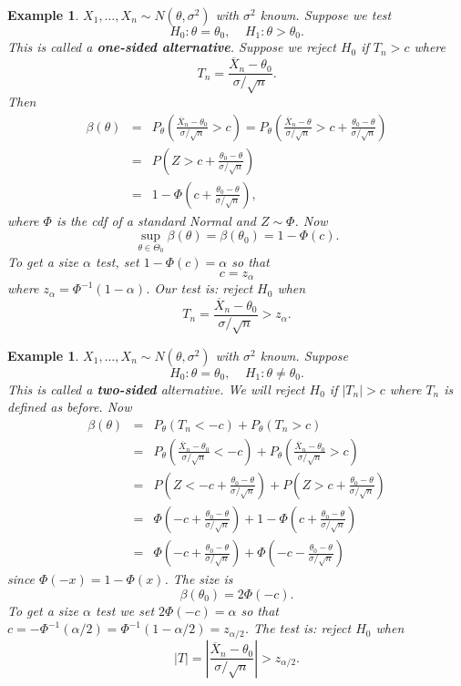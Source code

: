 \documentclass[twoside,12pt]{article}
\newtheorem{example}[theorem]{Example}
\begin{document}
\begin{example}
$X_1,\ldots, X_n \sim N(\theta,\sigma^2)$ with $\sigma^2$ known.
Suppose we test
$$
H_0: \theta = \theta_0,\ \ \ \ \ 
H_1: \theta > \theta_0.
$$
This is called a {\bf one-sided alternative}.
Suppose we reject $H_0$ if
$T_n> c$ where
$$
T_n = \frac{\overline{X}_n - \theta_0}{\sigma/\sqrt{n}}.
$$
Then
\begin{eqnarray*}
\beta(\theta) &=& 
P_\theta\left( \frac{\overline{X}_n - \theta_0}{\sigma/\sqrt{n}} > c \right)=
P_\theta\left( \frac{\overline{X}_n - \theta}{\sigma/\sqrt{n}} > c + 
\frac{\theta_0-\theta}{\sigma/\sqrt{n}} \right)\\
&=& P\left( Z > c+\frac{\theta_0-\theta}{\sigma/\sqrt{n}} \right) \\
&=& 1-\Phi\left( c+ \frac{\theta_0-\theta}{\sigma/\sqrt{n}} \right),
\end{eqnarray*}
where $\Phi$ is the cdf of a standard Normal and $Z\sim \Phi$.
Now
$$
\sup_{\theta\in\Theta_0}\beta(\theta) = \beta(\theta_0) = 1- \Phi(c).
$$
To get a size $\alpha$ test, set
$1-\Phi(c) = \alpha$ so that
$$
c = z_\alpha
$$
where $z_\alpha = \Phi^{-1}(1-\alpha)$.
Our test is: reject $H_0$ when
$$
T_n = \frac{\overline{X}_n - \theta_0}{\sigma/\sqrt{n}} > z_\alpha.
$$
\end{example}

\begin{example}
$X_1,\ldots, X_n \sim N(\theta,\sigma^2)$ with $\sigma^2$ known.
Suppose
$$
H_0: \theta = \theta_0,\ \ \ \ \ 
H_1: \theta \neq \theta_0.
$$
This is called a {\bf two-sided} alternative.
We will reject $H_0$ if
$|T_n|> c$ where
$T_n$ is defined as before.
Now
\begin{eqnarray*}
\beta(\theta) &=& 
P_\theta(T_n < -c) + P_\theta(T_n > c)\\
&=& 
P_\theta\left( \frac{\overline{X}_n - \theta_0}{\sigma/\sqrt{n}} < -c \right) +
P_\theta\left( \frac{\overline{X}_n - \theta_0}{\sigma/\sqrt{n}} > c \right)\\
&=& P\left( Z < -c+\frac{\theta_0-\theta}{\sigma/\sqrt{n}} \right) +
P\left( Z > c+\frac{\theta_0-\theta}{\sigma/\sqrt{n}} \right)\\
&=& 
\Phi\left( -c+ \frac{\theta_0-\theta}{\sigma/\sqrt{n}} \right) + 
1-\Phi\left( c+ \frac{\theta_0-\theta}{\sigma/\sqrt{n}} \right)\\
&=&
\Phi\left( -c+ \frac{\theta_0-\theta}{\sigma/\sqrt{n}} \right) + 
\Phi\left( -c- \frac{\theta_0-\theta}{\sigma/\sqrt{n}} \right)
\end{eqnarray*}
since $\Phi(-x) = 1 - \Phi(x)$.
The size is
$$
\beta(\theta_0) = 2\Phi(-c).
$$
To get a size $\alpha$ test we set
$2\Phi(-c) = \alpha$ so that
$c = -\Phi^{-1}(\alpha/2) = \Phi^{-1}(1-\alpha/2) = z_{\alpha/2}$.
The test is:
reject $H_0$ when
$$
|T| = \left|\frac{\overline{X}_n - \theta_0}{\sigma/\sqrt{n}}\right| > z_{\alpha/2}.
$$
\end{example}
\end{document}
